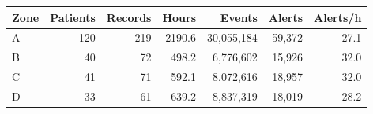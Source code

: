 \begin{tabular}{l r r r r r r}
\toprule
Zone & Patients & Records & Hours & Events & Alerts & Alerts/h \\
\midrule
A & 120 & 219 & 2190.6 & 30,055,184 & 59,372 & 27.1 \\
B & 40 & 72 & 498.2 & 6,776,602 & 15,926 & 32.0 \\
C & 41 & 71 & 592.1 & 8,072,616 & 18,957 & 32.0 \\
D & 33 & 61 & 639.2 & 8,837,319 & 18,019 & 28.2 \\
\bottomrule
\end{tabular}
